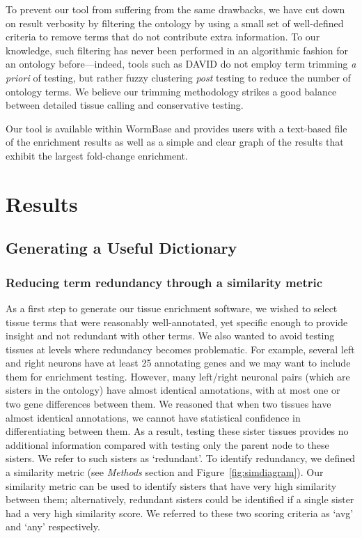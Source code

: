 \documentclass[linenumbers, doublespacing]{bmcart}
\begin{document}
	To prevent our tool from suffering from the same drawbacks, we have cut down on result verbosity by filtering the ontology by using a small set of well-defined criteria to remove terms that do not contribute extra information. To our knowledge, such filtering has never been performed in an algorithmic fashion for an ontology before---indeed, tools such as DAVID do not employ term trimming \emph{a priori} of testing, but rather fuzzy clustering \emph{post} testing to reduce the number of ontology terms. We believe our trimming methodology strikes a good balance between detailed tissue calling and conservative testing.	

	Our tool is available within WormBase and provides users with a text-based file of the enrichment results as well as a simple and clear graph of the results that exhibit the largest fold-change enrichment.

\section*{Results}
\subsection*{Generating a Useful Dictionary}
\subsubsection*{Reducing term redundancy through a similarity metric}
As a first step to generate our tissue enrichment software, we wished to select tissue terms that were reasonably well-annotated, yet specific enough to provide insight and not redundant with other terms. We also wanted to avoid testing tissues at levels where redundancy becomes problematic. For example, several left and right neurons have at least 25 annotating genes and we may want to include them for enrichment testing. However, many left/right neuronal pairs (which are sisters in the ontology) have almost identical annotations, with at most one or two gene differences between them. We reasoned that when two tissues have almost identical annotations, we cannot have statistical confidence in differentiating between them. As a result, testing these sister tissues provides no additional information compared with testing only the parent node to these sisters. We refer to such sisters as `redundant'. To identify redundancy, we defined a similarity metric (see \emph{Methods} section and Figure~\ref{fig:simdiagram}). Our similarity metric can be used to identify sisters that have very high similarity between them; alternatively, redundant sisters could be identified if a single sister had a very high similarity score. We referred to these two scoring criteria as `avg' and `any' respectively. 
\end{document}
